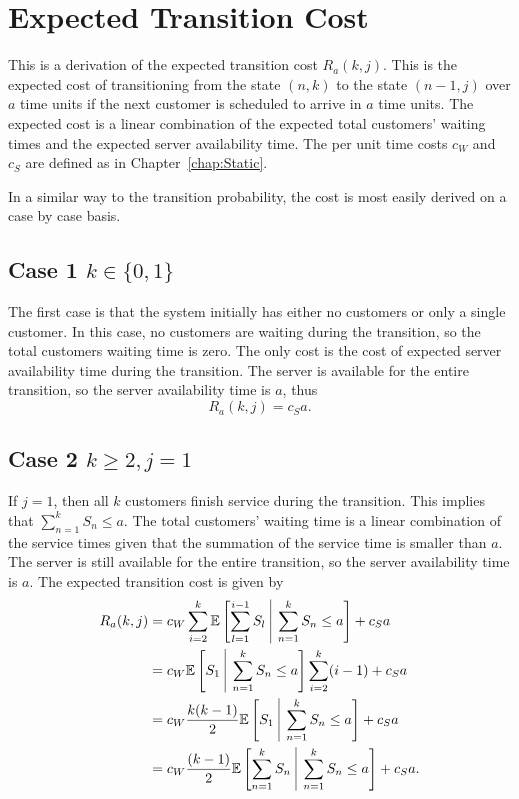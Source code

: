 \section{Expected Transition Cost}
This is a derivation of the expected transition cost $R_{a} (k, j)$. This is the expected cost of transitioning from the state $(n, k)$ to the state $(n - 1, j)$ over $a$ time units if the next customer is scheduled to arrive in $a$ time units. The expected cost is a linear combination of the expected total customers' waiting times and the expected server availability time. The per unit time costs $c_{W}$ and $c_{S}$ are defined as in Chapter~\ref{chap:Static}.

In a similar way to the transition probability, the cost is most easily derived on a case by case basis.

\subsection{Case 1 $k \in \{ 0, 1 \}$}
The first case is that the system initially has either no customers or only a single customer. In this case, no customers are waiting during the transition, so the total customers waiting time is zero. The only cost is the cost of expected server availability time during the transition. The server is available for the entire transition, so the server availability time is $a$, thus
\begin{equation}
	R_{a} (k, j) = c_{S} a.
\end{equation}

\subsection{Case 2 $k \geq 2, j = 1$}
If $j = 1$, then all $k$ customers finish service during the transition. This implies that $\displaystyle \sum_{n = 1}^{k} S_{n} \leq a$. The total customers' waiting time is a linear combination of the service times given that the summation of the service time is smaller than $a$. The server is still available for the entire transition, so the server availability time is $a$. The expected transition cost is given by
\begin{equation}
	\begin{split}
		R_{a} (k, j) & = c_{W} \sum_{i = 2}^{k} \mathbb{E} \left[ \sum_{l = 1}^{i - 1} S_{l} \ \vline \ \sum_{n = 1}^{k} S_{n} \leq a \right] + c_{S} a \\
		& = c_{W} \mathbb{E} \left[ S_{1} \ \vline \ \sum_{n = 1}^{k} S_{n} \leq a \right] \sum_{i = 2}^{k} (i - 1) + c_{S} a \\
		& = c_{W} \frac{k (k - 1)}{2} \mathbb{E} \left[ S_{1} \ \vline \ \sum_{n = 1}^{k} S_{n} \leq a \right] + c_{S} a \\
		& = c_{W} \frac{(k - 1)}{2} \mathbb{E} \left[ \sum_{n = 1}^{k} S_{n} \ \vline \ \sum_{n = 1}^{k} S_{n} \leq a \right] + c_{S} a.
	\end{split}
\end{equation}

